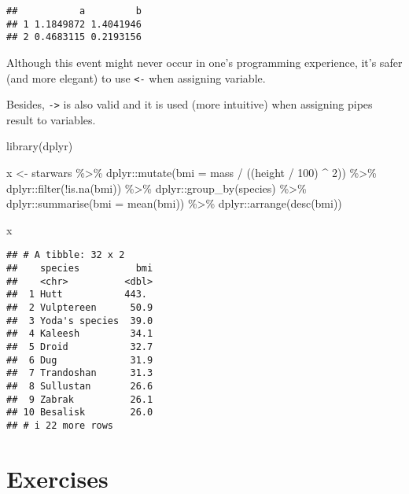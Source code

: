 \documentclass[
  oneside]{book}
\newenvironment{Shaded}{\begin{snugshade}}{\end{snugshade}}
\newcommand{\AttributeTok}[1]{\textcolor[rgb]{0.77,0.63,0.00}{#1}}
\newcommand{\DecValTok}[1]{\textcolor[rgb]{0.00,0.00,0.81}{#1}}
\newcommand{\FunctionTok}[1]{\textcolor[rgb]{0.00,0.00,0.00}{#1}}
\newcommand{\NormalTok}[1]{#1}
\newcommand{\OtherTok}[1]{\textcolor[rgb]{0.56,0.35,0.01}{#1}}
\newcommand{\SpecialCharTok}[1]{\textcolor[rgb]{0.00,0.00,0.00}{#1}}
\begin{document}
\begin{verbatim}
##           a         b
## 1 1.1849872 1.4041946
## 2 0.4683115 0.2193156
\end{verbatim}

Although this event might never occur in one's programming experience, it's
safer (and more elegant) to use \texttt{\textless{}-} when assigning variable.

Besides, \texttt{-\textgreater{}} is also valid and it is used (more intuitive) when assigning pipes
result to variables.

\begin{Shaded}
\begin{Highlighting}[]
\FunctionTok{library}\NormalTok{(dplyr)}

\NormalTok{x }\OtherTok{\textless{}{-}}\NormalTok{ starwars }\SpecialCharTok{\%\textgreater{}\%}
\NormalTok{  dplyr}\SpecialCharTok{::}\FunctionTok{mutate}\NormalTok{(}\AttributeTok{bmi =}\NormalTok{ mass }\SpecialCharTok{/}\NormalTok{ ((height }\SpecialCharTok{/} \DecValTok{100}\NormalTok{) }\SpecialCharTok{\^{}} \DecValTok{2}\NormalTok{)) }\SpecialCharTok{\%\textgreater{}\%}
\NormalTok{  dplyr}\SpecialCharTok{::}\FunctionTok{filter}\NormalTok{(}\SpecialCharTok{!}\FunctionTok{is.na}\NormalTok{(bmi)) }\SpecialCharTok{\%\textgreater{}\%}
\NormalTok{  dplyr}\SpecialCharTok{::}\FunctionTok{group\_by}\NormalTok{(species) }\SpecialCharTok{\%\textgreater{}\%}
\NormalTok{  dplyr}\SpecialCharTok{::}\FunctionTok{summarise}\NormalTok{(}\AttributeTok{bmi =} \FunctionTok{mean}\NormalTok{(bmi)) }\SpecialCharTok{\%\textgreater{}\%}
\NormalTok{  dplyr}\SpecialCharTok{::}\FunctionTok{arrange}\NormalTok{(}\FunctionTok{desc}\NormalTok{(bmi))}

\NormalTok{x}
\end{Highlighting}
\end{Shaded}

\begin{verbatim}
## # A tibble: 32 x 2
##    species          bmi
##    <chr>          <dbl>
##  1 Hutt           443. 
##  2 Vulptereen      50.9
##  3 Yoda's species  39.0
##  4 Kaleesh         34.1
##  5 Droid           32.7
##  6 Dug             31.9
##  7 Trandoshan      31.3
##  8 Sullustan       26.6
##  9 Zabrak          26.1
## 10 Besalisk        26.0
## # i 22 more rows
\end{verbatim}

\hypertarget{exercises}{%
\section{Exercises}\label{exercises}}
\end{document}
